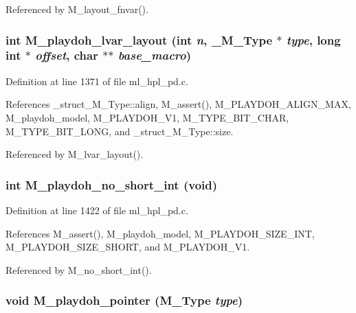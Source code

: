 Referenced by M\_\-layout\_\-fnvar().
\subsubsection{\setlength{\rightskip}{0pt plus 5cm}int M\_\-playdoh\_\-lvar\_\-layout (int {\em n}, \bf{\_\-M\_\-Type} $\ast$ {\em type}, long int $\ast$ {\em offset}, char $\ast$$\ast$ {\em base\_\-macro})}\label{ml__hpl__pd_8c_f432282662a79e7ea7ebbc454a43d816}




Definition at line 1371 of file ml\_\-hpl\_\-pd.c.

References \_\-struct\_\-M\_\-Type::align, M\_\-assert(), M\_\-PLAYDOH\_\-ALIGN\_\-MAX, M\_\-playdoh\_\-model, M\_\-PLAYDOH\_\-V1, M\_\-TYPE\_\-BIT\_\-CHAR, M\_\-TYPE\_\-BIT\_\-LONG, and \_\-struct\_\-M\_\-Type::size.

Referenced by M\_\-lvar\_\-layout().
\subsubsection{\setlength{\rightskip}{0pt plus 5cm}int M\_\-playdoh\_\-no\_\-short\_\-int (void)}\label{ml__hpl__pd_8c_7796cbeb61efe1fdf38bad6b7480e496}




Definition at line 1422 of file ml\_\-hpl\_\-pd.c.

References M\_\-assert(), M\_\-playdoh\_\-model, M\_\-PLAYDOH\_\-SIZE\_\-INT, M\_\-PLAYDOH\_\-SIZE\_\-SHORT, and M\_\-PLAYDOH\_\-V1.

Referenced by M\_\-no\_\-short\_\-int().
\subsubsection{\setlength{\rightskip}{0pt plus 5cm}void M\_\-playdoh\_\-pointer (\bf{M\_\-Type} {\em type})}\label{ml__hpl__pd_8c_849b764ac1110af853ad996076ad9793}




